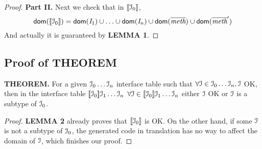 \begin{proof}
\noindent\textbf{Part II.} Next we check that in $[\![{\cal{I}}_0]\!]$, $$\textsf{dom}([\![{\cal{I}}_0]\!])=\textsf{dom}(\textit{I}_1)\cup\ldots\cup\textsf{dom}(\textit{I}_n)\cup\textsf{dom}(\overline{\textit{meth}})\cup\textsf{dom}(\overline{\textit{meth}}')$$
And actually it is guaranteed by \textbf{LEMMA 1}.

\end{proof}

\subsection{Proof of THEOREM}\label{subsec:proof3}
\textbf{THEOREM. }
For a given ${\cal{I}}_0\ldots{\cal{I}}_n$ interface table such that
$\forall{\cal{I}}\in{\cal{I}}_0\ldots{\cal{I}}_n, {\cal{I}}$ OK, then in the interface table
$[\![{\cal{I}}_0]\!]{\cal{I}}_1\ldots{\cal{I}}_n$
$\forall{\cal{I}}\in[\![{\cal{I}}_0]\!]{\cal{I}}_1\ldots{\cal{I}}_n$ either ${\cal{I}}$ OK or ${\cal{I}}$ is a subtype of ${\cal{I}}_0$.
\begin{proof}
\textbf{LEMMA 2} already proves that $[\![{\cal{I}}_0]\!]$ is OK. On the other hand, if some ${\cal{I}}$ is not a subtype of ${\cal{I}}_0$, 
 the generated code in translation has no way to affect the domain of ${\cal{I}}$, which finishes our proof.
\end{proof}
